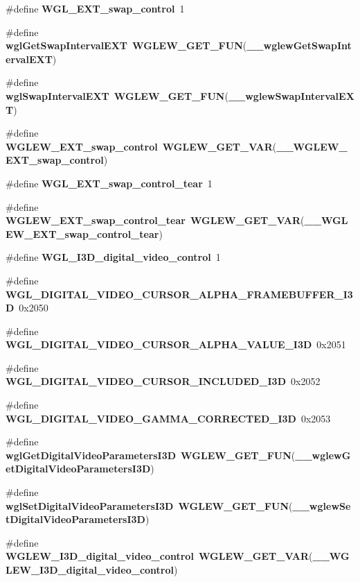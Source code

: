 \begin{DoxyCompactItemize}
\item 
\#define {\bf W\+G\+L\+\_\+\+E\+X\+T\+\_\+swap\+\_\+control}~1
\item 
\#define {\bf wgl\+Get\+Swap\+Interval\+E\+XT}~{\bf W\+G\+L\+E\+W\+\_\+\+G\+E\+T\+\_\+\+F\+UN}({\bf \+\_\+\+\_\+wglew\+Get\+Swap\+Interval\+E\+XT})
\item 
\#define {\bf wgl\+Swap\+Interval\+E\+XT}~{\bf W\+G\+L\+E\+W\+\_\+\+G\+E\+T\+\_\+\+F\+UN}({\bf \+\_\+\+\_\+wglew\+Swap\+Interval\+E\+XT})
\item 
\#define {\bf W\+G\+L\+E\+W\+\_\+\+E\+X\+T\+\_\+swap\+\_\+control}~{\bf W\+G\+L\+E\+W\+\_\+\+G\+E\+T\+\_\+\+V\+AR}({\bf \+\_\+\+\_\+\+W\+G\+L\+E\+W\+\_\+\+E\+X\+T\+\_\+swap\+\_\+control})
\item 
\#define {\bf W\+G\+L\+\_\+\+E\+X\+T\+\_\+swap\+\_\+control\+\_\+tear}~1
\item 
\#define {\bf W\+G\+L\+E\+W\+\_\+\+E\+X\+T\+\_\+swap\+\_\+control\+\_\+tear}~{\bf W\+G\+L\+E\+W\+\_\+\+G\+E\+T\+\_\+\+V\+AR}({\bf \+\_\+\+\_\+\+W\+G\+L\+E\+W\+\_\+\+E\+X\+T\+\_\+swap\+\_\+control\+\_\+tear})
\item 
\#define {\bf W\+G\+L\+\_\+\+I3\+D\+\_\+digital\+\_\+video\+\_\+control}~1
\item 
\#define {\bf W\+G\+L\+\_\+\+D\+I\+G\+I\+T\+A\+L\+\_\+\+V\+I\+D\+E\+O\+\_\+\+C\+U\+R\+S\+O\+R\+\_\+\+A\+L\+P\+H\+A\+\_\+\+F\+R\+A\+M\+E\+B\+U\+F\+F\+E\+R\+\_\+\+I3D}~0x2050
\item 
\#define {\bf W\+G\+L\+\_\+\+D\+I\+G\+I\+T\+A\+L\+\_\+\+V\+I\+D\+E\+O\+\_\+\+C\+U\+R\+S\+O\+R\+\_\+\+A\+L\+P\+H\+A\+\_\+\+V\+A\+L\+U\+E\+\_\+\+I3D}~0x2051
\item 
\#define {\bf W\+G\+L\+\_\+\+D\+I\+G\+I\+T\+A\+L\+\_\+\+V\+I\+D\+E\+O\+\_\+\+C\+U\+R\+S\+O\+R\+\_\+\+I\+N\+C\+L\+U\+D\+E\+D\+\_\+\+I3D}~0x2052
\item 
\#define {\bf W\+G\+L\+\_\+\+D\+I\+G\+I\+T\+A\+L\+\_\+\+V\+I\+D\+E\+O\+\_\+\+G\+A\+M\+M\+A\+\_\+\+C\+O\+R\+R\+E\+C\+T\+E\+D\+\_\+\+I3D}~0x2053
\item 
\#define {\bf wgl\+Get\+Digital\+Video\+Parameters\+I3D}~{\bf W\+G\+L\+E\+W\+\_\+\+G\+E\+T\+\_\+\+F\+UN}({\bf \+\_\+\+\_\+wglew\+Get\+Digital\+Video\+Parameters\+I3D})
\item 
\#define {\bf wgl\+Set\+Digital\+Video\+Parameters\+I3D}~{\bf W\+G\+L\+E\+W\+\_\+\+G\+E\+T\+\_\+\+F\+UN}({\bf \+\_\+\+\_\+wglew\+Set\+Digital\+Video\+Parameters\+I3D})
\item 
\#define {\bf W\+G\+L\+E\+W\+\_\+\+I3\+D\+\_\+digital\+\_\+video\+\_\+control}~{\bf W\+G\+L\+E\+W\+\_\+\+G\+E\+T\+\_\+\+V\+AR}({\bf \+\_\+\+\_\+\+W\+G\+L\+E\+W\+\_\+\+I3\+D\+\_\+digital\+\_\+video\+\_\+control})

\end{DoxyCompactItemize}
